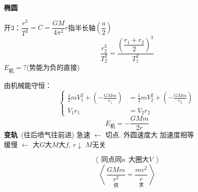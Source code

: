 \textbf{椭圆}


开3：\quad $\dfrac{r^{3}}{T^{2}}=C=\dfrac{GM}{4\pi^{2}}$\quad $r$指半长轴$\left(\dfrac{a}{2}\right)$ %
\[ \frac{r_2^{3}}{T_2^{2}}=\frac{\left(\dfrac{r_1+r_2}{2}\right)^{3}}{T_1^{2}} \]
$E_{\text{机}}=?$\quad (势能为负的直接) %

由机械能守恒：
\[
\left\{\begin{aligned}
\frac{1}{2}mV_1^{2}+\left(-\frac{GMm}{r_1}\right)&=\frac{1}{2}mV_2^{2}+\left(-\frac{GMm}{r_2}\right)\\
V_1r_1&=V_2r_2
\end{aligned}\right.
\]
\[ E_{\text{机}}=-\frac{GMm}{2r} \]
\textbf{变轨}\ (往后喷气往前进)
\noindent 急速 $\leftarrow$ 切点. 外圆速度大 加速度相等\\
缓慢 $\leftarrow$ 大$G$大$M$大$f$, $r\downarrow$ $M$无关

\[ \left\langle\ \text{同点同}a\ \ \text{大圈大}V\ \right\rangle \]
\[ \left\langle\ \underset{\text{供}}{\frac{GMm}{r^{2}}}=\underset{\text{求}}{\frac{mv^{2}}{r}}\ \right\rangle \]

